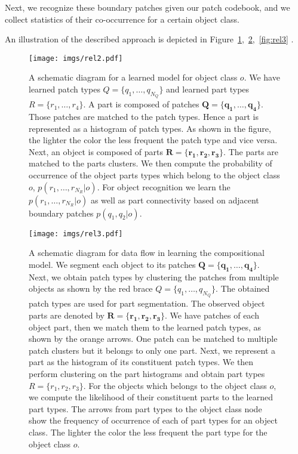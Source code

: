\documentclass[a4paper,11pt,pdf]{pacmanreport}
\begin{document}
Next, we recognize these boundary patches given our patch codebook,
and we collect statistics of their co-occurrence for a certain object
class.

An illustration of the described approach is depicted in Figure~\ref{fig:rel},~\ref{fig:rel2},~\ref{fig:rel3} .
\begin{figure}[h!]
\begin{center}
\texttt{[image: imgs/rel2.pdf]}
\end{center}
\caption{A schematic diagram for a learned model for object class $o$. We have learned patch types $Q=\{q_1,\ldots,q_{N_{Q}}\}$ and learned part types $R=\{r_1,\ldots,r_4\}$. A part is composed of patches $\mathbf{Q}=\{\mathbf{q_1},\ldots,\mathbf{q_4}\}$. Those patches are matched to the patch types. Hence a part is represented as a histogram of patch types. As shown in the figure, the lighter the color the less frequent the patch type and vice versa. Next, an object is composed of parts $\mathbf{R}=\{\mathbf{r_1},\mathbf{r_2},\mathbf{r_3}\}$. The parts are matched to the parts clusters. We then compute the probability of occurrence of the object parts types which belong to the object class $o$, $p(r_1,\ldots,r_{N_{R}} \vert o)$. For object recognition we learn the $p(r_1,\ldots,r_{N_{R}} \vert o)$ as well as part connectivity based on adjacent boundary patches $p(q_{1},q_{2} \vert o)$. 
} 
\label{fig:rel}
\end{figure}

\begin{figure}[h!]
\begin{center}
\texttt{[image: imgs/rel3.pdf]}
\end{center}
\caption{A schematic diagram for data flow in learning the compositional model. We segment each object to its patches $\mathbf{Q}=\{\mathbf{q_1},\ldots,\mathbf{q_4}\}$. Next, we obtain patch types by clustering the patches from multiple objects as shown by the red brace $Q=\{q_1,\ldots,q_{N_{Q}}\}$. The obtained patch types are used for part segmentation. The observed object parts are denoted by $\mathbf{R}=\{\mathbf{r_1},\mathbf{r_2},\mathbf{r_3}\}$. We have patches of each object part, then we match them to the learned patch types, as shown by the orange arrows. One patch can be matched to multiple patch clusters but it belongs to only one part. Next, we represent a part as the histogram of its constituent patch types. We then perform clustering on the part histograms and obtain part types $R=\{r_1,r_2,r_3\}$. For the objects which belongs to the object class $o$, we compute the likelihood of their constituent parts to the learned part types. The arrows from part types to the object class node show the frequency of occurrence of each of part types for an object class. The lighter the color the less frequent the part type for the object class $o$.} 
\label{fig:rel2}
\end{figure}
\end{document}
